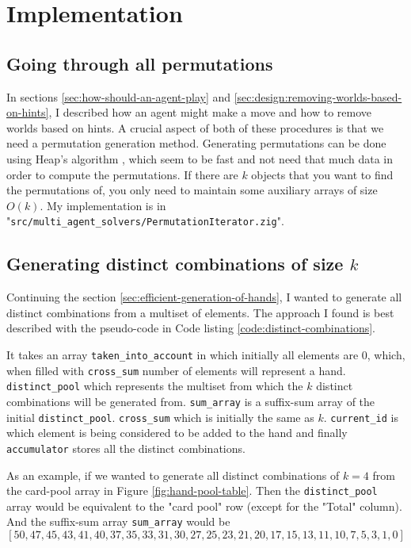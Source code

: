 \section{Implementation}

\subsection{Going through all permutations}
In sections \ref{sec:how-should-an-agent-play} and \ref{sec:design:removing-worlds-based-on-hints}, I described how an agent might make a move and how to remove worlds based on hints.
A crucial aspect of both of these procedures is that we need a permutation generation method.
Generating permutations can be done using Heap's algorithm \cite{wiki:heapsalgorithm}, which seem to be fast and not need that much data in order to compute the permutations.
If there are $k$ objects that you want to find the permutations of, you only need to maintain some auxiliary arrays of size $O(k)$.
My implementation is in "{\tt src/multi\_agent\_solvers/PermutationIterator.zig}". 


\subsection{Generating distinct combinations of size $k$} \label{implementation:sec:generating-distinct-combinations}
Continuing the section \ref{sec:efficient-generation-of-hands}, I wanted to generate all distinct combinations from a multiset of elements.
The approach I found is best described with the pseudo-code in Code listing \ref{code:distinct-combinations}. 

It takes an array {\tt  taken\_into\_account} in which initially all elements are 0, which, when filled with {\tt cross\_sum} number of elements will represent a hand.
{\tt distinct\_pool} which represents the multiset from which the $k$ distinct combinations will be generated from.
{\tt sum\_array} is a suffix-sum array of the initial {\tt distinct\_pool}.
{\tt cross\_sum} which is initially the same as $k$.
{\tt current\_id} is which element is being considered to be added to the hand and finally {\tt accumulator} stores all the distinct combinations.

As an example, if we wanted to generate all distinct combinations of $k=4$ from the card-pool array in Figure \ref{fig:hand-pool-table}.
Then the {\tt distinct\_pool} array would be equivalent to the "card pool" row (except for the "Total" column).
And the suffix-sum array {\tt sum\_array} would be
\[
[50, 47, 45, 43, 41, 40, 37, 35, 33, 31, 30, 27, 25, 23, 21, 20, 17, 15, 13, 11, 10, 7, 5, 3, 1, 0]
\]

